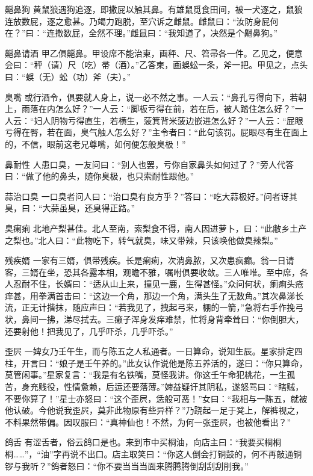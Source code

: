 \documentclass[12pt,UTF8]{ctexbook}
\begin{document}
齆鼻狗
黄鼠狼遇狗追逐，即撒屁以触其鼻。有雄鼠觅食田间，被一犬逐之，鼠狼连放数屁，逐之愈甚。乃竭力跑脱，至穴诉之雌鼠。雌鼠曰：“汝防身屁何在？”曰：“连撒数屁，全然不理。”雌鼠曰：“我知道了，决然是个齆鼻狗。”

齆鼻请酒
甲乙俱齆鼻。甲设席不能治柬，画秤、尺、笤帚各一件。乙见之，便意会曰：“秤（请）尺（吃）帚（酒）。”乙答柬，画蜈蚣一条，斧一把。甲见之，点头曰：“蜈（无）蚣（功）斧（夫）。”

臭嘴
或行酒令，俱要就人身上，说一必不然之事。一人云：“鼻孔亏得向下，若朝上，雨落在内怎么好？”一人云：“脚板亏得在前，若在后，被人踏住怎么好？”一人云：“妇人阴物亏得直生，若横生，菠箕背米菠边嵌进怎么好？”一人云：“屁眼亏得在臀，若在面，臭气触人怎么好？”主令者曰：“此句该罚。屁眼尽有生在面上的，不信，眼前这老兄尊嘴，如何便怎般臭极！”

鼻耐性
人患口臭，一友问曰：“别人也罢，亏你自家鼻头如何过了？”旁人代答曰：“做了他的鼻头，随你臭极，也只索耐性跟他。”

蒜治口臭
一口臭者问人曰：“治口臭有良方乎？”答曰：“吃大蒜极好。”问者讶其臭，曰：“大蒜虽臭，还臭得正路。”

臭瘌痢
北地产梨甚佳。北人至南，索梨食不得，南人因进萝卜，曰：“此敝乡土产之梨也。”北人曰：“此物吃下，转气就臭，味又带辣，只该唤他做臭辣梨。”

残疾婿
一家有三婿，俱带残疾。长是瘌痢，次淌鼻脓，又次患疯癫。翁一日请客，三婿在坐，恐其各露本相，观瞻不雅，嘱咐俱要收敛。三人唯唯。至中席，各人忍耐不住，长婿曰：“适从山上来，撞见一鹿，生得甚怪。”众问何状，瘌痢头疮痒甚，用拳满首击曰：“这边一个角，那边一个角，满头生了无数角。”其次鼻涕长流，正无计揩抹，随应声曰：“若我见了，拽起弓来，棚的一箭，”急将右手作挽弓状，鼻间一拂，涕尽拭去。三癞子浑身发痒难禁，忙将身背牵耸曰：“你倒胆大，还要射他！把我见了，几乎吓杀，几乎吓杀。”

歪屄
一婢女乃壬午生，而与陈五之人私通者。一日算命，说知生辰。星家排定四柱，开言曰：“娘子是壬午养的。”此女认作说他是陈五养活的，遂曰：“你只算命，莫管闲事。”星家复言：“我是有名铁嘴，莫怪我讲。你这壬午命犯桃花，一生孤苦，身充贱役，性情惫赖，后运还要落薄。”婢益疑讦其阴私，遂怒骂曰：“瞎贼，不要你算了！”星士亦怒曰：“这个歪屄，恁般可恶！”女曰：“我相与一陈五，就被他认破。今他说我歪屄，莫非此物原有些异样？”乃跷起一足于凳上，解裤视之，不料果然带偏。因叹服曰：“真神仙也！不然，为何一张歪屄，也被他看出？”

鸽舌
有涩舌者，俗云鸽口是也。来到市中买桐油，向店主曰：“我要买桐桐桐……”，“油”字再说不出口。店主取笑曰：“你这人倒会打铜鼓的，何不再敲通铜锣与我听？”鸽者怒曰：“你不要当当当面来腾腾腾倒刮刮刮削我。”
\end{document}
